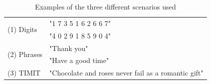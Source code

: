 \begin{table}
    \begin{tabular}{l|p{6.2cm}}
        \multirow{2}{*}{(1) Digits}  
        & "1 7 3 5 1 6 2 6 6 7"\\
        & "4 0 2 9 1 8 5 9 0 4"\\
        \hline
        \multirow{2}{*}{(2) Phrases}  
        & "Thank you"\\
        & "Have a good time"\\
        \hline
        (3) TIMIT & "Chocolate and roses never fail as a romantic gift"
    \end{tabular}
    \caption{Examples of the three different scenarios used}
    \label{tab:ouluSecnarioExamp}
\end{table}
